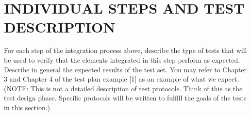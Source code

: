 \section{INDIVIDUAL STEPS AND TEST DESCRIPTION}
For  each  step  of  the  integration  process  above,  describe  the  type  of  tests  that  will  be  used  to  verify  that  the  elements  integrated  in  this  step  perform  as  expected.  Describe  in  general  the  expected  results  of  the  test  set.  You  may  refer  to  Chapter  3  and  Chapter  4  of  the  test  plan  example [1] as an example of what we expect. 
(NOTE:  This  is  not  a  detailed  description  of  test  protocols.  Think  of  this  as  the  test  design  phase. Specific protocols will be written to fulfill the goals of the tests in this section.) 
